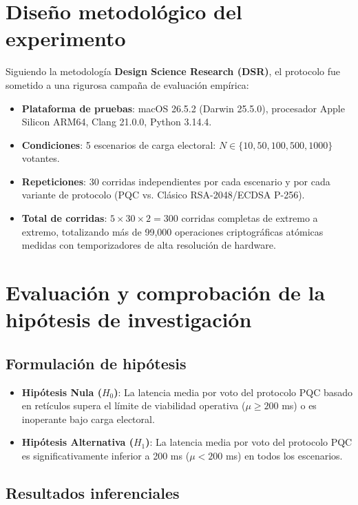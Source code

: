 \documentclass[11pt,a4paper,twoside,openright]{book}
\theoremstyle{plain}
\theoremstyle{definition}
\theoremstyle{remark}
\begin{document}
\section{Dise\~no metodol\'ogico del experimento}

Siguiendo la metodolog\'ia \textbf{Design Science Research (DSR)}, el protocolo fue sometido a una rigurosa campa\~na de evaluaci\'on emp\'irica:
\begin{itemize}
  \item \textbf{Plataforma de pruebas}: macOS 26.5.2 (Darwin 25.5.0), procesador Apple Silicon ARM64, Clang 21.0.0, Python 3.14.4.
  \item \textbf{Condiciones}: 5 escenarios de carga electoral: $N \in \{10, 50, 100, 500, 1000\}$ votantes.
  \item \textbf{Repeticiones}: 30 corridas independientes por cada escenario y por cada variante de protocolo (PQC vs. Cl\'asico RSA-2048/ECDSA P-256).
  \item \textbf{Total de corridas}: $5 \times 30 \times 2 = 300$ corridas completas de extremo a extremo, totalizando m\'as de 99,000 operaciones criptogr\'aficas at\'omicas medidas con temporizadores de alta resoluci\'on de hardware.
\end{itemize}

\section{Evaluaci\'on y comprobaci\'on de la hip\'otesis de investigaci\'on}

\subsection{Formulaci\'on de hip\'otesis}
\begin{itemize}
  \item \textbf{Hip\'otesis Nula ($H_0$)}: La latencia media por voto del protocolo PQC basado en ret\'iculos supera el l\'imite de viabilidad operativa ($\mu \geq 200$ ms) o es inoperante bajo carga electoral.
  \item \textbf{Hip\'otesis Alternativa ($H_1$)}: La latencia media por voto del protocolo PQC es significativamente inferior a 200 ms ($\mu < 200$ ms) en todos los escenarios.
\end{itemize}

\subsection{Resultados inferenciales}
\end{document}
